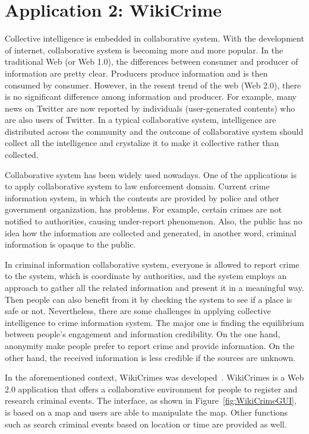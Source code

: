 \section{Application 2: WikiCrime}

Collective intelligence is embedded in collaborative system. With the development of internet, collaborative system is becoming more and more popular. In the traditional Web (or Web 1.0), the differences between consumer and producer of information are pretty clear. Producers produce information and is then consumed by consumer. However, in the resent trend of the web (Web 2.0), there is no significant difference among information and producer. For example, many news on Twitter are now reported by individuals (user-generated contents) who are also users of Twitter. In a typical collaborative system, intelligence are distributed across the community and the outcome of collaborative system should collect all the intelligence and crystalize it to make it collective rather than collected.

Collaborative system has been widely used nowadays. One of the applications is to apply collaborative system to law enforcement domain. Current crime information system, in which the contents are provided by police and other government organization, has problems. For example, certain crimes are not notified to authorities, causing under-report phenomenon. Also, the public has no idea how the information are collected and generated, in another word, criminal information is opaque to the public.

In criminal information collaborative system, everyone is allowed to report crime to the system, which is coordinate by authorities, and the system employs an approach to gather all the related information and present it in a meaningful way. Then people can also benefit from it by checking the system to see if a place is safe or not. Nevertheless, there are some challenges in applying collective intelligence to crime information system. The major one is finding the equilibrium between people’s engagement and information credibility. On the one hand, anonymity make people prefer to report crime and provide information. On the other hand, the received information is less credible if the sources are unknown.

In the aforementioned context, WikiCrimes was developed~\cite{wikicrimes}. WikiCrimes is a Web 2.0 application that offers a collaborative environment for people to register and research criminal events. The interface, as shown in Figure~\ref{fig:WikiCrimeGUI}, is based on a map and users are able to manipulate the map. Other functions such as search criminal events based on location or time are provided as well. 

